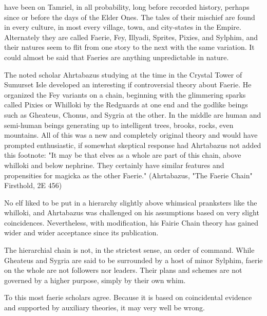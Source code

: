 
 have been on Tamriel, in all probability, long before recorded history, perhaps since or before the days of the Elder Ones. The tales of their mischief are found in every culture, in most every village, town, and city-states in the Empire. Alternately they are called Faerie, Fey, Illyadi, Sprites, Pixies, and Sylphim, and their natures seem to flit from one story to the next with the same variation. It could almost be said that Faeries are anything unpredictable in nature.

The noted scholar Ahrtabazus studying at the time in the Crystal Tower of Sumurset Isle developed an interesting if controversial theory about Faerie. He organized the Fey variants on a chain, beginning with the glimmering sparks called Pixies or Whilloki by the Redguards at one end and the godlike beings such as Gheateus, Chonus, and Sygria at the other. In the middle are human and semi-human beings generating up to intelligent trees, brooks, rocks, even mountains. All of this was a new and completely original theory and would have prompted enthusiastic, if somewhat skeptical response had Ahrtabazus not added this footnote: "It may be that elves as a whole are part of this chain, above whilloki and below nephrine. They certainly have similar features and propensities for magicka as the other Faerie." (Ahrtabazus, "The Faerie Chain" Firsthold, 2E 456)

No elf liked to be put in a hierarchy slightly above whimsical pranksters like the whilloki, and Ahrtabazus was challenged on his assumptions based on very slight coincidences. Nevertheless, with modification, his Fairie Chain theory has gained wider and wider acceptance since its publication.

The hierarchial chain is not, in the strictest sense, an order of command. While Gheateus and Sygria are said to be surrounded by a host of minor Sylphim, faerie on the whole are not followers nor leaders. Their plans and schemes are not governed by a higher purpose, simply by their own whim.

To this most faerie scholars agree. Because it is based on coincidental evidence and supported by auxiliary theories, it may very well be wrong.